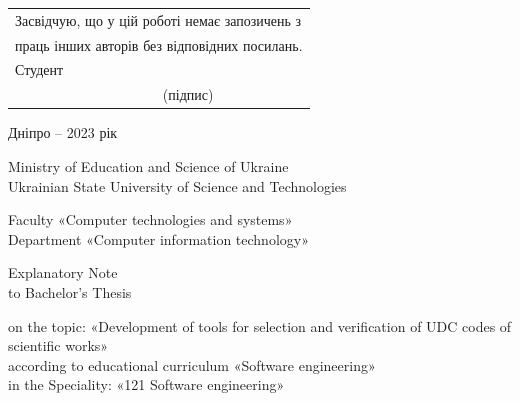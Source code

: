 \documentclass[14pt]{extarticle}
\begin{document}
\begin{spacing}{1}
\vspace{\baselineskip}
\vspace{\baselineskip}
\vspace{\baselineskip}
\vspace{\baselineskip}
\vspace{\baselineskip}
\vspace{\baselineskip}

\begin{flushright}
  \begin{tabular}{ll}
    \multicolumn{2}{l}{Засвідчую, що у цій роботі немає запозичень з}\\
    \multicolumn{2}{l}{праць інших авторів без відповідних посилань.}\\
    Студент & \\ \cline{2-2}
            & \fontsize{10}{10}\selectfont(підпис) \\
  \end{tabular}
\end{flushright}

\vspace*{\fill}
\centerline{Дніпро – 2023 рік}
\end{spacing}

\thispagestyle{empty}

\newpage
\thispagestyle{empty}

\begin{spacing}{1}
\begin{center}
  Ministry of Education and Science of Ukraine \\
  Ukrainian State University of Science and Technologies

  \vspace{\baselineskip}

  Faculty «Computer technologies and systems»\\
  Department «Computer information technology»\\

  \vspace{\baselineskip}

  {\fontsize{18}{18}\selectfont Explanatory Note}\\
  to Bachelor's Thesis\\

  \vspace{\baselineskip}
\end{center}
on the topic: «Development of tools for selection and
verification of UDC codes of scientific works»\\
according to educational curriculum «Software engineering»\\
in the Speciality: «121 Software engineering»\\
\end{spacing}
\end{document}
